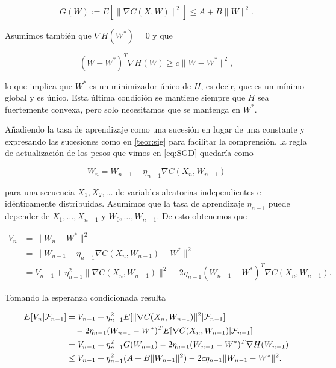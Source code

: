 \begin{equation*}
	G(W):= E[ \| \nabla C(X,W)\|^2] \leq A + B\|W\|^2.
\end{equation*}

Asumimos también que $\nabla H(W^*)=0$ y que

\begin{equation*}
	(W-W^*)^T \nabla H(W) \geq c \|W - W^*\|^2,
\end{equation*}

lo que implica que $W^*$ es un minimizador único de $H$, es decir, que es un mínimo global y es único. Esta última condición se mantiene siempre que $H$ sea fuertemente convexa, pero solo necesitamos que se mantenga en $W^*$.

Añadiendo la tasa de aprendizaje como una sucesión en lugar de una constante y expresando las sucesiones como en \ref{teor:sig} para facilitar la comprensión, la regla de actualización de los pesos que vimos en \ref{eq:SGD} quedaría como

\begin{equation*}
W_{n} = W_{n-1} - \eta_{n-1} \nabla C(X_n, W_{n-1})
\end{equation*} 

para una secuencia $X_1, X_2, \ldots$ de variables aleatorias independientes e idénticamente distribuidas. Asumimos que la tasa de aprendizaje $\eta_{n-1}$ puede depender de $X_1, \ldots, X_{n-1}$ y $W_0, \ldots, W_{n-1}$. De esto obtenemos que 

\begin{align*}
	V_{n} &= \| W_{n} - W^* \|^2 \\
	       &= \| W_{n-1} - \eta_{n-1} \nabla C(X_{n}, W_{n-1}) - W^* \|^2 \\
	       &= V_{n-1} + \eta^2_{n-1} \|\nabla C(X_n, W_{n-1}) \|^2 - 2\eta_{n-1}(W_{n-1} - W^*)^T \nabla C(X_n, W_{n-1}).
\end{align*}

Tomando la esperanza condicionada resulta

\begin{align}
	E[V_n | \mathcal{F}_{n-1}] &= V_{n-1} + \eta^2_{n-1} E[ \| \nabla C(X_n, W_{n-1}) \|^2 | \mathcal{F}_{n-1}] \notag \\
	& \quad - 2\eta_{n-1}(W_{n-1} - W^*)^T E[ \nabla C(X_n, W_{n-1}) | \mathcal{F}_{n-1}] \notag \\  
	&= V_{n-1} + \eta^2_{n-1} G(W_{n-1}) - 2 \eta_{n-1}(W_{n-1} - W^*)^T \nabla H(W_{n-1}) \notag \\
	&\leq V_{n-1} + \eta^2_{n-1} (A+B \|W_{n-1} \|^2) - 2c \eta_{n-1} \|W_{n-1} - W^*\|^2. \label{eq:sig1}
\end{align}

